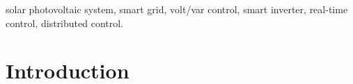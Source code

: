 \documentclass[journal]{IEEEtran}
\begin{document}
\vspace{-2.5mm}
\begin{IEEEkeywords}
solar photovoltaic system, smart grid, volt/var control, smart inverter, real-time control, distributed control.
\end{IEEEkeywords}
\vspace{-2mm}
%
\IEEEpeerreviewmaketitle

\section{Introduction}
% 
% 
% 
% 

\end{document}
